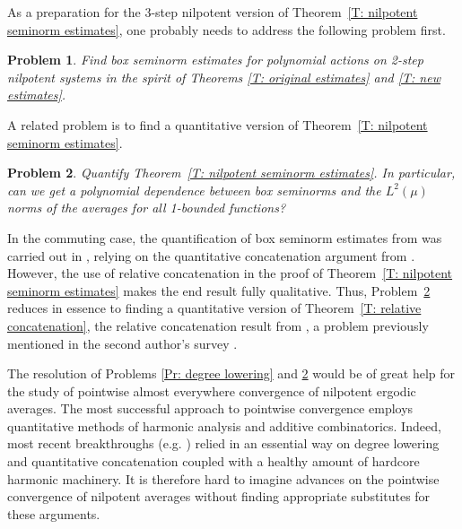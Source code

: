 \documentclass[11pt]{amsart}
\newtheorem{problem}{Problem}
\theoremstyle{definition}
\newcommand{\1}{{\mathbf{1}}}
\begin{document}
As a preparation for the 3-step nilpotent version of Theorem~\ref{T: nilpotent seminorm estimates}, one probably needs to address the following problem first.
\begin{problem}\label{Pr: nilpotent box seminorm estimates}
    Find box seminorm estimates for polynomial actions on 2-step nilpotent systems in the spirit of Theorems \ref{T: original estimates} and \ref{T: new estimates}.
\end{problem}

A related problem is to find a quantitative version of Theorem~\ref{T: nilpotent seminorm estimates}.
\begin{problem}\label{Pr: quantitative estimates}
    Quantify Theorem~\ref{T: nilpotent seminorm estimates}. In particular, can we get a polynomial dependence between box seminorms and the $L^2(\mu)$ norms of the averages for all 1-bounded functions?
\end{problem}
In the commuting case, the quantification of box seminorm estimates from \cite{DFKS22} was carried out in \cite{DKKST24}, relying on the quantitative concatenation argument from \cite{KKL24a, Kuc23}. However, the use of relative concatenation in the proof of Theorem~\ref{T: nilpotent seminorm estimates} makes the end result fully qualitative. Thus, Problem~\ref{Pr: quantitative estimates} reduces in essence to finding a quantitative version of Theorem~\ref{T: relative concatenation}, the relative concatenation result from \cite{DKKST25}, a problem previously mentioned in the second author's survey \cite[Problem~23]{Kuc26}.

The resolution of Problems \ref{Pr: degree lowering} and \ref{Pr: quantitative estimates} would be of great help for the study of pointwise almost everywhere convergence of nilpotent ergodic averages. The most successful approach to pointwise convergence employs quantitative methods of harmonic analysis and additive combinatorics. Indeed, most recent breakthroughs (e.g. \cite{KMPWW24, KMT20, KMTT24, MWW25, Ter24}) relied in an essential way on degree lowering and quantitative concatenation coupled with a healthy amount of hardcore harmonic machinery. It is therefore hard to imagine advances on the pointwise convergence of nilpotent averages without finding appropriate substitutes for these arguments.
\end{document}
